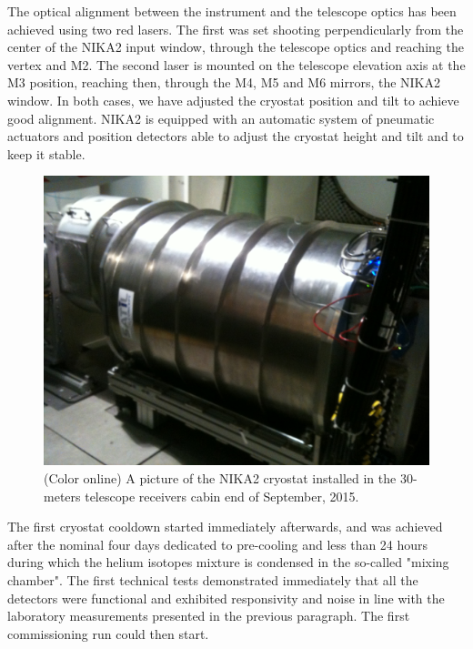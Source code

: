 \documentclass[]{aa} %
\begin{document}
The optical alignment between the instrument and the telescope optics has been achieved using two red lasers. The first was set shooting perpendicularly from the center of the NIKA2 input window, through the telescope optics and reaching the vertex and M2. The second laser is mounted on the telescope elevation axis at the M3 position, reaching then, through the M4, M5 and M6 mirrors, the NIKA2 window. In both cases, we have adjusted the cryostat position and tilt to achieve good alignment. NIKA2 is equipped with an automatic system of pneumatic actuators and position detectors able to adjust the cryostat height and tilt and to keep it stable. 

\begin{figure}[h]
   \centering
    \includegraphics[width=.85\linewidth]{NIKA2cryo.jpg}
      \caption{(Color online) A picture of the NIKA2 cryostat installed in the 30-meters telescope receivers cabin end of September, 2015.}
         \label{Fig5}
\end{figure}

The first cryostat cooldown started immediately afterwards, and was achieved after the nominal four days dedicated to pre-cooling and less than 24 hours during which the helium isotopes mixture is condensed in the so-called "mixing chamber". The first technical tests demonstrated immediately that all the detectors were functional and exhibited responsivity and noise in line with the laboratory measurements presented in the previous paragraph. The first commissioning run could then start.




\end{document}
